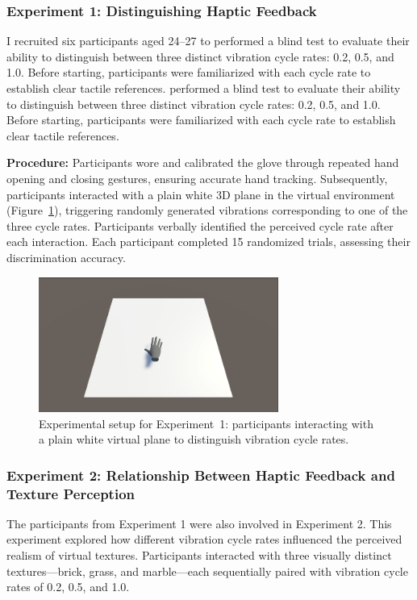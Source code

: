 \documentclass[graybox]{svmult}
\begin{document}
\subsubsection{Experiment 1: Distinguishing Haptic Feedback}
I recruited six participants aged 24–27 to performed a blind test to evaluate their ability to distinguish between three distinct vibration cycle rates: 0.2, 0.5, and 1.0. Before starting, participants were familiarized with each cycle rate to establish clear tactile references.
performed a blind test to evaluate their ability to distinguish between three distinct vibration cycle rates: 0.2, 0.5, and 1.0. Before starting, participants were familiarized with each cycle rate to establish clear tactile references.

\textbf{Procedure:} Participants wore and calibrated the glove through repeated hand opening and closing gestures, ensuring accurate hand tracking. Subsequently, participants interacted with a plain white 3D plane in the virtual environment (Figure~\ref{fig:experiment1_setup}), triggering randomly generated vibrations corresponding to one of the three cycle rates. Participants verbally identified the perceived cycle rate after each interaction. Each participant completed 15 randomized trials, assessing their discrimination accuracy.

\begin{figure}[H]
	\centering
	\includegraphics[width=0.7\textwidth]{figure/ex1.png}%
	\caption{Experimental setup for Experiment~1: participants interacting with a plain white virtual plane to distinguish vibration cycle rates.}\label{fig:experiment1_setup}
\end{figure}

\subsubsection{Experiment 2: Relationship Between Haptic Feedback and Texture Perception}
The participants from Experiment 1 were also involved in Experiment 2. This experiment explored how different vibration cycle rates influenced the perceived realism of virtual textures. Participants interacted with three visually distinct textures—brick, grass, and marble—each sequentially paired with vibration cycle rates of 0.2, 0.5, and 1.0.
\end{document}
